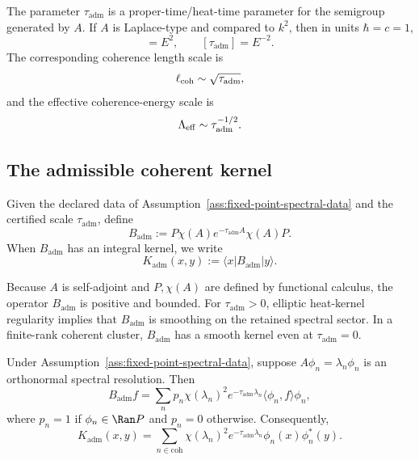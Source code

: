 \documentclass[11pt]{article}
\newcommand{\Kadm}{K_{\mathrm{adm}}}
\newcommand{\Badm}{B_{\mathrm{adm}}}
\newcommand{\ta}{\tau_{\mathrm{adm}}}
\newcommand{\coh}{\mathrm{coh}}
\begin{document}
\begin{remark}
\label{rem:heat-time}
The parameter \(\ta\) is a proper-time/heat-time parameter for the semigroup generated by
\(A\). If \(A\) is Laplace-type and compared to \(k^2\), then in units \(\hbar=c=1\),
\begin{equation}
  [A]=E^2,
  \qquad
  [\ta]=E^{-2}.
\end{equation}
The corresponding coherence length scale is
\begin{equation}
  \ell_{\rm coh}\sim \sqrt{\ta},
\end{equation}
and the effective coherence-energy scale is
\begin{equation}
  \Lambda_{\rm eff}\sim \ta^{-1/2}.
\end{equation}
\end{remark}

\subsection{The admissible coherent kernel}
\label{subsec:admissible-kernel}

\begin{definition}
\label{def:admissible-coherent-operator}
Given the declared data of Assumption~\ref{ass:fixed-point-spectral-data} and the certified
scale \(\ta\), define
\begin{equation}
  \Badm
  :=
  P\chi(A)e^{-\ta A}\chi(A)P.
  \label{eq:Badm-definition}
\end{equation}
When \(\Badm\) has an integral kernel, we write
\begin{equation}
  \Kadm(x,y)
  :=
  \langle x|\Badm|y\rangle.
  \label{eq:Kadm-definition}
\end{equation}
\end{definition}

Because \(A\) is self-adjoint and \(P,\chi(A)\) are defined by functional calculus, the operator
\(\Badm\) is positive and bounded. For \(\ta>0\), elliptic heat-kernel regularity implies that
\(\Badm\) is smoothing on the retained spectral sector. In a finite-rank coherent cluster,
\(\Badm\) has a smooth kernel even at \(\ta=0\).

\begin{proposition}
\label{prop:spectral-form}
Under Assumption~\ref{ass:fixed-point-spectral-data}, suppose \(A\phi_n=\lambda_n\phi_n\) is an
orthonormal spectral resolution. Then
\begin{equation}
  \Badm f
  =
  \sum_n
  p_n\chi(\lambda_n)^2 e^{-\ta\lambda_n}
  \langle \phi_n,f\rangle\phi_n,
  \label{eq:Badm-spectral-action}
\end{equation}
where \(p_n=1\) if \(\phi_n\in\Ran P\) and \(p_n=0\) otherwise. Consequently,
\begin{equation}
  \Kadm(x,y)
  =
  \sum_{n\in\coh}
  \chi(\lambda_n)^2 e^{-\ta\lambda_n}
  \phi_n(x)\phi_n^\ast(y).
  \label{eq:Kadm-spectral}
\end{equation}
\end{proposition}
\end{document}
